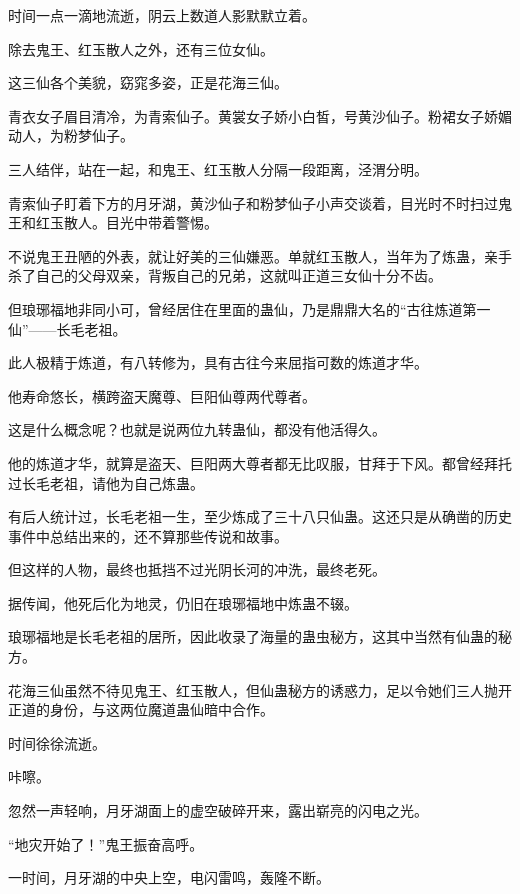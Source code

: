 
\begin{this_body}



时间一点一滴地流逝，阴云上数道人影默默立着。

除去鬼王、红玉散人之外，还有三位女仙。

这三仙各个美貌，窈窕多姿，正是花海三仙。

青衣女子眉目清冷，为青索仙子。黄裳女子娇小白皙，号黄沙仙子。粉裙女子娇媚动人，为粉梦仙子。

三人结伴，站在一起，和鬼王、红玉散人分隔一段距离，泾渭分明。

青索仙子盯着下方的月牙湖，黄沙仙子和粉梦仙子小声交谈着，目光时不时扫过鬼王和红玉散人。目光中带着警惕。

不说鬼王丑陋的外表，就让好美的三仙嫌恶。单就红玉散人，当年为了炼蛊，亲手杀了自己的父母双亲，背叛自己的兄弟，这就叫正道三女仙十分不齿。

但琅琊福地非同小可，曾经居住在里面的蛊仙，乃是鼎鼎大名的“古往炼道第一仙”——长毛老祖。

此人极精于炼道，有八转修为，具有古往今来屈指可数的炼道才华。

他寿命悠长，横跨盗天魔尊、巨阳仙尊两代尊者。

这是什么概念呢？也就是说两位九转蛊仙，都没有他活得久。

他的炼道才华，就算是盗天、巨阳两大尊者都无比叹服，甘拜于下风。都曾经拜托过长毛老祖，请他为自己炼蛊。

有后人统计过，长毛老祖一生，至少炼成了三十八只仙蛊。这还只是从确凿的历史事件中总结出来的，还不算那些传说和故事。

但这样的人物，最终也抵挡不过光阴长河的冲洗，最终老死。

据传闻，他死后化为地灵，仍旧在琅琊福地中炼蛊不辍。

琅琊福地是长毛老祖的居所，因此收录了海量的蛊虫秘方，这其中当然有仙蛊的秘方。

花海三仙虽然不待见鬼王、红玉散人，但仙蛊秘方的诱惑力，足以令她们三人抛开正道的身份，与这两位魔道蛊仙暗中合作。

时间徐徐流逝。

咔嚓。

忽然一声轻响，月牙湖面上的虚空破碎开来，露出崭亮的闪电之光。

“地灾开始了！”鬼王振奋高呼。

一时间，月牙湖的中央上空，电闪雷鸣，轰隆不断。


\end{this_body}
